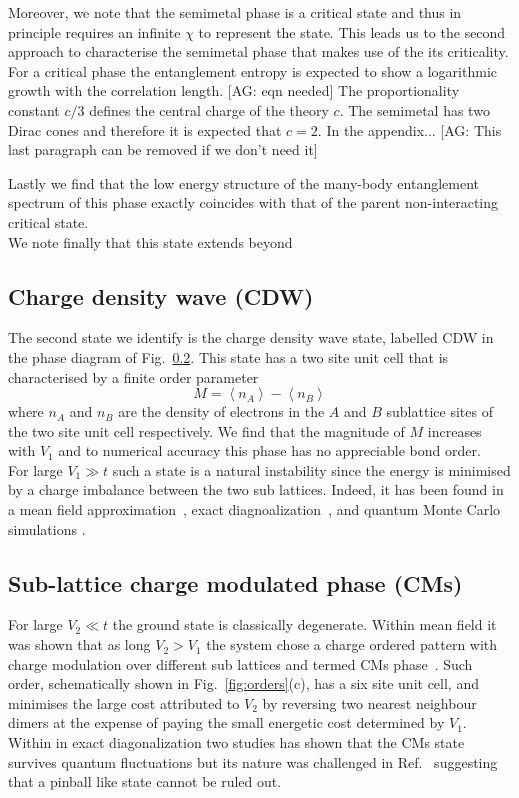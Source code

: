 \documentclass[aps,prx,10pt,twocolumn,floatfix,superscriptaddress,showpacs,numerical,footinbib]{revtex4-1}
\newcommand{\noteAG}[1]{{\color{blue} [AG: #1]}}
\begin{document}
%
Moreover, we note that the semimetal phase is a critical state and thus in principle requires an infinite $\chi$ to represent the state.
%
This leads us to the second approach to characterise the semimetal phase that makes use of the its criticality.
%
For a critical phase the entanglement entropy is expected to show a logarithmic growth with the correlation length.
\noteAG{eqn needed}
%
The proportionality constant $c/3$ defines the central charge of the theory $c$. 
%
The semimetal has two Dirac cones and therefore it is expected that $c=2$. 
%
In the appendix...
\noteAG{This last paragraph can be removed if we don't need it}

%
Lastly we find that the low energy structure of the many-body 
entanglement spectrum of this phase exactly coincides with that of the parent non-interacting critical state.\\ 
%

%
We note finally that this state extends beyond 

\subsection{Charge density wave (CDW)}
%
The second state we identify is the charge density wave state, labelled CDW in the phase diagram of Fig.~\ref{}.
%
This state has a two site unit cell that is characterised by a finite order parameter
%
\begin{equation}
\label{eq:CDW}
%
M=\left\langle n_{A} \right\rangle-\left\langle n_{B}\right\rangle
%
\end{equation}
%
where $n_{A}$ and $n_{B}$ are the density of electrons in the $A$ and $B$ sublattice sites of the two site unit cell respectively.
%
We find that the magnitude of $M$ increases with $V_{1}$ and to numerical accuracy this phase has no appreciable bond order.\\
%

For large $V_{1}\gg t$ such a state is a natural instability since the energy is minimised by a charge imbalance between the two sub lattices.
%
Indeed, it has been found in a mean field approximation~\cite{RQHZ08,WF10,GCCdJVV13}, exact diagnoalization~\cite{GGNVC13,DH14,DCH14}, and quantum Monte Carlo simulations
\cite{WCT14}.
%


\subsection{Sub-lattice charge modulated phase (CMs)}
%
For large $V_{2}\ll t$ the ground state is classically degenerate. 
%
Within mean field it was shown that as long $V_{2}>V_{1}$
the system chose a charge ordered pattern with charge modulation over different sub lattices and termed CMs phase~\cite{CMs}.
%
Such order, schematically shown in Fig.~\ref{fig:orders}(c), has a six site unit cell, and minimises the large cost
attributed to $V_{2}$ by reversing two nearest neighbour dimers at the expense of paying the small energetic cost
determined by $V_{1}$.
%
Within in exact diagonalization two studies has shown that the CMs state survives quantum fluctuations 
but its nature was challenged in Ref.~ suggesting that a pinball like state cannot be ruled out.\\
\end{document}

